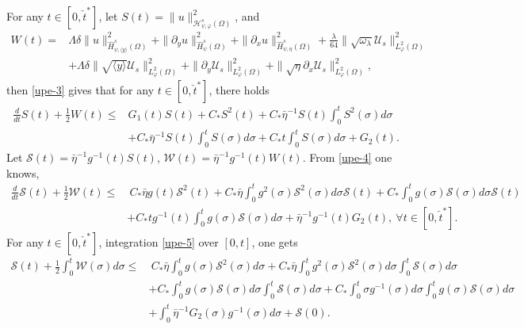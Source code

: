 \documentclass{amsart}
\numberwithin{equation}{section}
\newcommand\y{{{\langle y \rangle}}}
\begin{document}
For any $t\in [0,\check{t}^{*}]$, let $S(t)=\|u\|_{\mathcal{H}_{\psi,\varphi}^{s}(\Omega)}^{2}$, and
\begin{align*}
W(t)
=& \Lambda\delta\|u\|_{\hat{H}_{\psi,\y}^{s}(\Omega)}^{2}
  +\|\partial_{y}u\|_{\hat{H}_{\psi}^{s}(\Omega)}^{2}
  +\|\partial_{x}u\|_{\hat{H}_{\psi,\eta}^{s}(\Omega)}^{2}
  +\frac{\lambda}{64}\|\sqrt{\omega_{\lambda}}\mathcal{U}_{s}\|_{L_{\varphi}^{2}(\Omega)}^{2}\\
 &+\Lambda\delta\|\sqrt{\y}\mathcal{U}_{s}\|_{L_{\varphi}^{2}(\Omega)}^{2}
  +\|\partial_{y}\mathcal{U}_{s}\|_{L_{\varphi}^{2}(\Omega)}^{2}
  +\|\sqrt{\eta}\partial_{x}\mathcal{U}_{s}\|_{L_{\varphi}^{2}(\Omega)}^{2},
\end{align*}
then \eqref{upe-3} gives that for any $t\in [0,\check{t}^{*}]$, there holds
\begin{align}\label{upe-4}
\frac{d}{dt}S(t)+\frac{1}{2}W(t)
\leq& G_{1}(t)S(t)
     +C_{*}S^{2}(t)
     +C_{*}\bar{\eta}^{-1}S(t)\int_{0}^{t}S^{2}(\sigma)d\sigma\\
    &+C_{*}\bar{\eta}^{-1}S(t)\int_{0}^{t}S(\sigma)d\sigma
     +C_{*}t\int_{0}^{t}S(\sigma)d\sigma
     +G_{2}(t).\nonumber
\end{align}
Let $\mathcal{S}(t)=\bar{\eta}^{-1}g^{-1}(t)S(t)$, $\mathcal{W}(t)=\bar{\eta}^{-1}g^{-1}(t)W(t)$. From \eqref{upe-4} one knows,
\begin{align}\label{upe-5}
\frac{d}{dt}\mathcal{S}(t)+\frac{1}{2}\mathcal{W}(t)
\leq&~C_{*}\bar{\eta}g(t)\mathcal{S}^{2}(t)
     +C_{*}\bar{\eta}\int_{0}^{t}g^{2}(\sigma)\mathcal{S}^{2}(\sigma)d\sigma\mathcal{S}(t)
     +C_{*}\int_{0}^{t}g(\sigma)\mathcal{S}(\sigma)d\sigma\mathcal{S}(t)\\
    &+C_{*}tg^{-1}(t)\int_{0}^{t}g(\sigma)\mathcal{S}(\sigma)d\sigma
     +\bar{\eta}^{-1}g^{-1}(t)G_{2}(t),~\forall t\in [0,\check{t}^{*}].\nonumber
\end{align}
For any $t\in[0,\check{t}^{*}]$, integration \eqref{upe-5} over $[0,t]$, one gets
\begin{align}\label{upe-6}
\mathcal{S}(t)+\frac{1}{2}\int_{0}^{t}\mathcal{W}(\sigma)d\sigma
\leq&~C_{*}\bar{\eta}\int_{0}^{t}g(\sigma)\mathcal{S}^{2}(\sigma)d\sigma
     +C_{*}\bar{\eta}\int_{0}^{t}g^{2}(\sigma)\mathcal{S}^{2}(\sigma)d\sigma\int_{0}^{t}\mathcal{S}(\sigma)d\sigma\\
    &+C_{*}\int_{0}^{t}g(\sigma)\mathcal{S}(\sigma)d\sigma\int_{0}^{t}\mathcal{S}(\sigma)d\sigma
     +C_{*}\int_{0}^{t}\sigma g^{-1}(\sigma)d\sigma\int_{0}^{t}g(\sigma)\mathcal{S}(\sigma)d\sigma\nonumber\\
    &+\int_{0}^{t}\bar{\eta}^{-1}G_{2}(\sigma)g^{-1}(\sigma)d\sigma
     +\mathcal{S}(0).\nonumber
\end{align}
\end{document}
